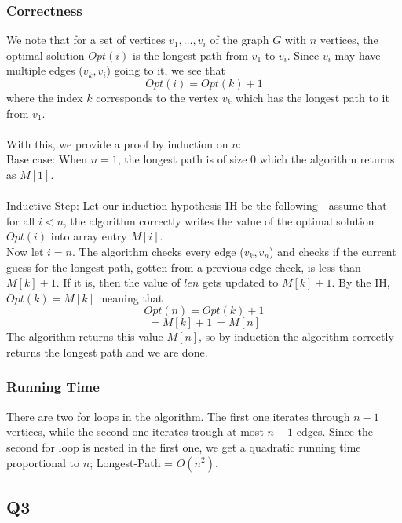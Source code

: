 \documentclass[12pt, oneside]{article}
\begin{document}
\subsubsection*{Correctness}
We note that for a set of vertices $v_1,\dots,v_i$ of the graph $G$ with $n$ vertices, the optimal solution $Opt(i)$ is the longest path from $v_1$ to $v_i$. Since $v_i$ may have multiple edges ($v_k,v_i$) going to it, we see that
\[Opt(i) = Opt(k) + 1\]
where the index $k$ corresponds to the vertex $v_k$ which has the longest path to it from $v_1$.\\\\
With this, we provide a proof by induction on $n$:\\
Base case: When $n = 1$, the longest path is of size 0 which the algorithm returns as $M[1]$.\\\\
Inductive Step: Let our induction hypothesis IH be the following - assume that for all $i < n$, the algorithm correctly writes the value of the optimal solution $Opt(i)$ into array entry $M[i]$.\\
Now let $i = n$. The algorithm checks every edge ($v_k,v_n$) and checks if the current guess for the longest path, gotten from a previous edge check, is less than $M[k]+1$. If it is, then the value of $len$ gets updated to $M[k]+1$. By the IH, $Opt(k) = M[k]$ meaning that 
\[Opt(n) = Opt(k) + 1\]
\[= M[k] +1 \,= M[n]\]
The algorithm returns this value $M[n]$, so by induction the algorithm correctly returns the longest path and we are done.\\
\subsubsection*{Running Time}
There are two for loops in the algorithm. The first one iterates through $n-1$ vertices, while the second one iterates trough at most $n-1$ edges. Since the second for loop is nested in the first one, we get a quadratic running time proportional to $n$; Longest-Path = $O(n^2)$.\\

\subsection*{Q3}
\end{document}
